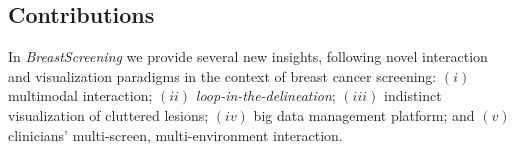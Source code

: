 \subsection{Contributions}

In {\it BreastScreening} we provide several new insights, following novel interaction and visualization paradigms in the context of breast cancer screening:
$(i)$ multimodal interaction;
$(ii)$ {\it loop-in-the-delineation};
$(iii)$ indistinct visualization of cluttered lesions;
$(iv)$ big data management platform; and
$(v)$ clinicians' multi-screen, multi-environment interaction.